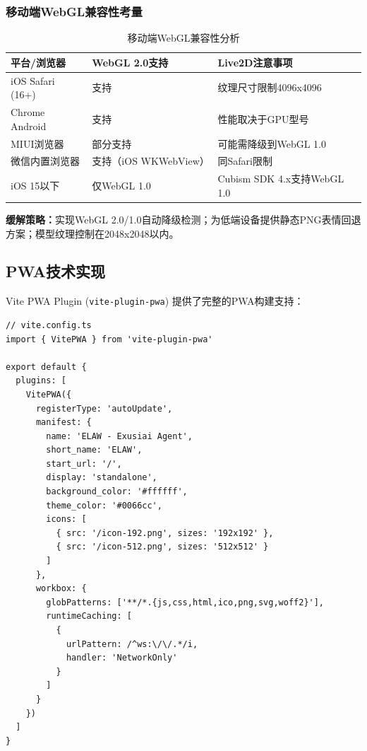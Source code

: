 \documentclass[fontset=mac,a4paper,11pt]{ctexart}
\begin{document}
\subsubsection{移动端WebGL兼容性考量}

\begin{table}[H]
\centering
\caption{移动端WebGL兼容性分析}
\label{tab:webgl-mobile}
\begin{tabular}{L{3.5cm}L{4cm}L{4.5cm}}
\toprule
\textbf{平台/浏览器} & \textbf{WebGL 2.0支持} & \textbf{Live2D注意事项} \\
\midrule
{}
iOS Safari (16+) & 支持 & 纹理尺寸限制4096x4096 \\
Chrome Android & 支持 & 性能取决于GPU型号 \\
MIUI浏览器 & 部分支持 & 可能需降级到WebGL 1.0 \\
微信内置浏览器 & 支持（iOS WKWebView） & 同Safari限制 \\
iOS 15以下 & 仅WebGL 1.0 & Cubism SDK 4.x支持WebGL 1.0 \\
\bottomrule
\end{tabular}
\end{table}

\textbf{缓解策略：}实现WebGL 2.0/1.0自动降级检测；为低端设备提供静态PNG表情回退方案；模型纹理控制在2048x2048以内。

\subsection{PWA技术实现}

Vite PWA Plugin (\texttt{vite-plugin-pwa}) 提供了完整的PWA构建支持：

\begin{lstlisting}[caption=Vite PWA配置示例]
// vite.config.ts
import { VitePWA } from 'vite-plugin-pwa'

export default {
  plugins: [
    VitePWA({
      registerType: 'autoUpdate',
      manifest: {
        name: 'ELAW - Exusiai Agent',
        short_name: 'ELAW',
        start_url: '/',
        display: 'standalone',
        background_color: '#ffffff',
        theme_color: '#0066cc',
        icons: [
          { src: '/icon-192.png', sizes: '192x192' },
          { src: '/icon-512.png', sizes: '512x512' }
        ]
      },
      workbox: {
        globPatterns: ['**/*.{js,css,html,ico,png,svg,woff2}'],
        runtimeCaching: [
          {
            urlPattern: /^ws:\/\/.*/i,
            handler: 'NetworkOnly'
          }
        ]
      }
    })
  ]
}
\end{lstlisting}
\end{document}
